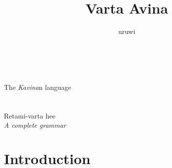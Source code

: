 \documentclass{book}
\title{Varta Avina}
\author{uruwi}
\begin{document}
\pagecolor{ForestGreen!25}

\begin{titlepage}
    \makeatletter
    \begin{center}
        {\color{BlueGreen} \hprule \vspace{1.5ex} \\}
        {\huge\sffamily \textcolor{PineGreen}{\@title} \\}
        {\large The \textit{Kavina}n language \\}
        {\color{BlueGreen} \hprule \vspace{1.5ex} \\}
        \vspace{1.5cm}
        {\Large\bfseries \@author}\\[5pt]
        \vspace{2cm}
        {Retami-varta hee} \\[5pt]
        \emph{A complete grammar}\\[2cm]
        \vfill
        \vfill
        {\@date}
    \end{center}
    \makeatother
\end{titlepage}

\pagecolor{ForestGreen!15}

\tableofcontents

\section{Introduction}
\end{document}
